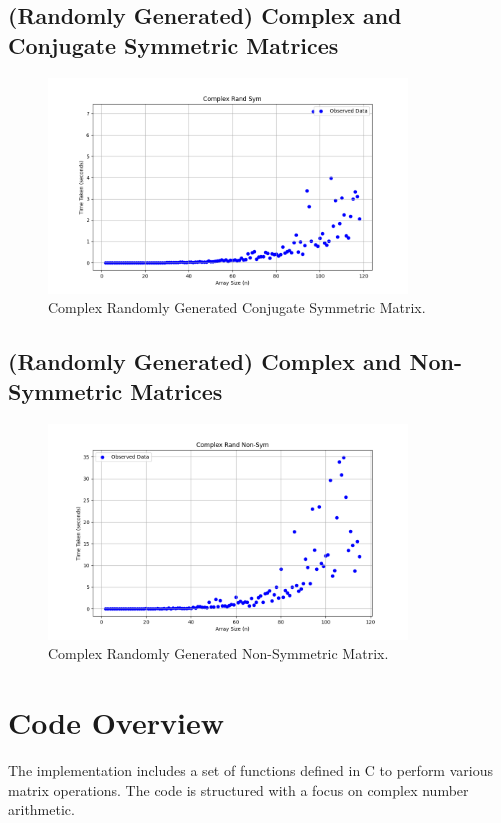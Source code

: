 \documentclass[12pt]{article}
\begin{document}
 	\subsection{(Randomly Generated) Complex and Conjugate Symmetric Matrices}
 	\begin{figure}[h]
 		\centering
 		\includegraphics[width=0.85\textwidth]{figs/crs.png}
 		\caption{Complex Randomly Generated Conjugate Symmetric Matrix.}
 	\end{figure}
 	\subsection{(Randomly Generated) Complex and Non-Symmetric Matrices}
 	\begin{figure}[h]
 		\centering
 		\includegraphics[width=0.85\textwidth]{figs/crns.png}
 		\caption{Complex Randomly Generated Non-Symmetric Matrix.}
 	\end{figure}
 	
 	\newpage
	\section{Code Overview}
	The implementation includes a set of functions defined in C to perform various matrix operations. The code is structured with a focus on complex number arithmetic.
	
\end{document}
